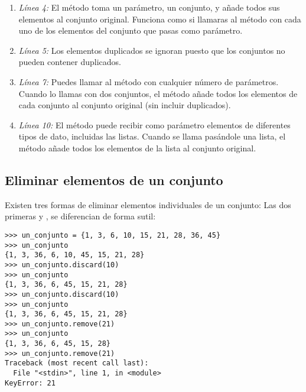\begin{enumerate}

\item \emph{Línea 4:} El método  toma un parámetro, un conjunto, y añade todos sus elementos al conjunto original. Funciona como si llamaras al método  con cada uno de los elementos del conjunto que pasas como parámetro.

\item \emph{Línea 5:} Los elementos duplicados se ignoran puesto que los conjuntos no pueden contener duplicados.

\item \emph{Línea 7:} Puedes llamar al método  con cualquier número de parámetros. Cuando lo llamas con dos conjuntos, el método añade todos los elementos de cada conjunto al conjunto original (sin incluir duplicados).

\item \emph{Línea 10:} El método  puede recibir como parámetro elementos de diferentes tipos de dato, incluidas las listas. Cuando se llama pasándole una lista, el método  añade todos los elementos de la lista al conjunto original.

\end{enumerate}

\subsection{Eliminar elementos de un conjunto}

Existen tres formas de eliminar elementos individuales de un conjunto: Las dos primeras  y , se diferencian de forma sutil:

\noindent\begin{minipage}{\textwidth}
\begin{lstlisting}[mathescape=True]
>>> un_conjunto = {1, 3, 6, 10, 15, 21, 28, 36, 45}
>>> un_conjunto
{1, 3, 36, 6, 10, 45, 15, 21, 28}
>>> un_conjunto.discard(10)
>>> un_conjunto
{1, 3, 36, 6, 45, 15, 21, 28}
>>> un_conjunto.discard(10)
>>> un_conjunto
{1, 3, 36, 6, 45, 15, 21, 28}
>>> un_conjunto.remove(21)
>>> un_conjunto
{1, 3, 36, 6, 45, 15, 28}
>>> un_conjunto.remove(21)
Traceback (most recent call last):
  File "<stdin>", line 1, in <module>
KeyError: 21
\end{lstlisting}
\end{minipage}

